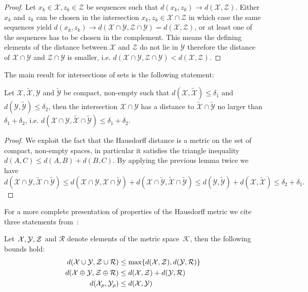 %
\begin{proof}
Let $x_k\in\mathcal X,z_k\in\mathcal Z$ be sequences such that $d(x_k,z_k)\to d(\mathcal X,\mathcal Z)$.
%
Either $x_k$ and $z_k$ can be chosen in the intersection $x_k,z_k\in\mathcal X\cap\mathcal Z$ in which case the same sequences yield $d(x_k,z_k)\to d(\mathcal X\cap\mathcal Y,\mathcal Z\cap\mathcal Y) = d(\mathcal X,\mathcal Z)$, or at least one of the sequences has to be chosen in the complement.
%
This means the defining elements of the distance between $\mathcal X$ and $\mathcal Z$ do not lie in $\mathcal Y$ therefore the distance of $\mathcal X\cap\mathcal Y$ and $\mathcal Z\cap\mathcal Y$ is smaller, i.e. $d(\mathcal X\cap\mathcal Y,\mathcal Z\cap\mathcal Y)< d(\mathcal X,\mathcal Z)$.
\end{proof}
%
\noindent The main result for intersections of sets is the following statement:
%
\begin{thm}
Let $\mathcal X,\tilde{\mathcal X},\mathcal Y$ and $\tilde{\mathcal Y}$ be compact, non-empty such that $d(\mathcal X,\tilde{\mathcal X})\leq\delta_1$ and $d(\mathcal Y,\tilde{\mathcal Y})\leq\delta_2$, then the intersection $\mathcal X\cap \mathcal Y$ has a distance to $\tilde{\mathcal X}\cap\tilde{\mathcal Y}$ no larger than $\delta_1+\delta_2$, i.e. $d(\mathcal X\cap \mathcal Y,\tilde{\mathcal X}\cap\tilde{\mathcal Y})\leq\delta_1+\delta_2$.
\end{thm}
%
\begin{proof}
We exploit the fact that the Hausdorff distance is a metric on the set of compact, non-empty spaces, in particular it satisfies the triangle inequality $d(A,C)\leq d(A,B)+d(B,C)$.
%
By applying the previous lemma twice we have 
%
\begin{equation}
	d(\mathcal X\cap \mathcal Y,\tilde{\mathcal X}\cap\tilde{\mathcal Y}) \leq d(\mathcal X\cap \mathcal Y,\mathcal X\cap\tilde{\mathcal Y}) + d(\mathcal X\cap\tilde{\mathcal Y},\tilde{\mathcal X}\cap\tilde{\mathcal Y}) \leq d(\mathcal Y,\tilde{\mathcal Y}) + d(\mathcal X,\tilde{\mathcal X}) \leq \delta_2 + \delta_1.
\end{equation}
\end{proof}
%
\noindent For a more complete presentation of properties of the Hausdorff metric we cite three statements from~\cite{Hadwiger:1957}:
%
\begin{thm}
Let~$\mathcal X,\mathcal Y, \mathcal Z$ and $\mathcal R$ denote elements of the metric space~$\mathcal K$, then the following bounds hold:
%
\begin{align}
	d(\mathcal X\cup\mathcal Y,\mathcal Z\cup\mathcal R)&\leq\max\{d(\mathcal X,\mathcal Z),d(\mathcal Y,\mathcal R)\}\\
	d(\mathcal X\oplus\mathcal Y,\mathcal Z\oplus\mathcal R)&\leq d(\mathcal X,\mathcal Z) + d(\mathcal Y,\mathcal R)\\
	d(\mathcal X_\rho,\mathcal Y_\rho)&\leq d(\mathcal X,\mathcal Y)
\end{align}
\end{thm}
